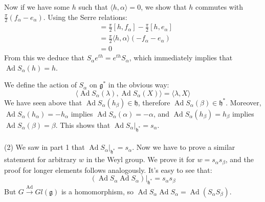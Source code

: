 \documentclass[12 pt]{article}
\newcommand{\fr}{\mathfrak}
\DeclareMathOperator {\Ad} {Ad}
\begin{document}
Now if we have some $h$ such that $\langle h , \alpha \rangle = 0$, we show that $h$ commutes with $\frac{\pi}{2} (f_{\alpha} - e_{\alpha})$. Using the Serre relations:
\begin{align*}
[h, \frac{\pi}{2} (f_{\alpha} - e_{\alpha})] &= \frac{\pi}{2} [h, f_{\alpha}] - \frac{\pi}{2} [h, e_{\alpha}] \\
&=\frac{\pi}{2} \langle h, \alpha \rangle (- f_{\alpha} - e_{\alpha}) \\
&= 0
\end{align*}
From this we deduce that $S_{\alpha} e^{th} = e^{th} S_{\alpha}$, which immediately implies that $\Ad S_{\alpha} (h) = h$.

We define the action of $S_{\alpha}$ on $\fr g^*$ in the obvious way:
\[             \langle \Ad S_{\alpha} (\lambda) , \Ad S_{\alpha} (X) \rangle = \langle \lambda , X  \rangle            \]
We have seen above that $ \Ad S_{\alpha} (h_{\beta}) \in \fr h$, therefore $\Ad S_{\alpha} (\beta) \in \fr h^*$. Moreover, $\Ad S_{\alpha} (h_{\alpha}) = - h_{\alpha}$ implies $\Ad S_{\alpha} (\alpha) = - \alpha$, and $\Ad S_{\alpha} (h_{\beta}) = h_{\beta}$ implies $\Ad S_{\alpha} (\beta) = \beta$. This shows that $\Ad S_{\alpha} |_{\fr h^*} = s_{\alpha}$.
\\
\\
(2) We saw in part 1 that $\Ad S_{\alpha} |_{\fr h^*} = s_{\alpha}$. Now we have to prove a similar statement for arbitrary $w$ in the Weyl group. We prove it for $w = s_{\alpha} s_{\beta}$, and the proof for longer elements follows analogously. It's easy to see that:
\[   ( \Ad S_{\alpha} \Ad S_{\alpha} )|_{\fr h^*} = s_{\alpha} s_{\beta}        \]
But $G \overset{\Ad}{\to} Gl(\fr g)$ is a homomorphism, so $\Ad S_{\alpha} \Ad S_{\alpha} = \Ad (S_{\alpha} S_{\beta})$.
\end{document}
